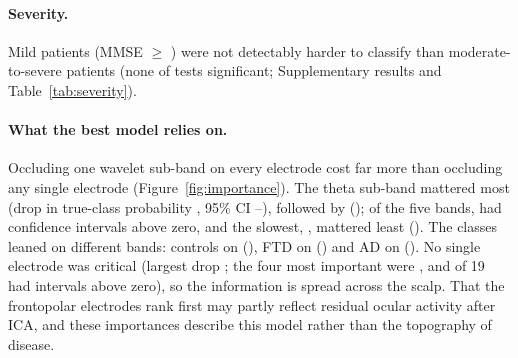 \paragraph{Severity.} Mild patients (MMSE $\ge$ \sevMildMin{}) were not detectably harder to classify than moderate-to-severe patients (none of \sevNTests{} tests significant; Supplementary results and Table~\ref{tab:severity}).

\paragraph{What the best model relies on.} Occluding one wavelet sub-band on every electrode cost
far more than occluding any single electrode (Figure~\ref{fig:importance}). The theta sub-band
\occTopBand{} mattered most (drop in true-class probability \occTopBandDrop{}, 95\% CI
\occTopBandLo{}--\occTopBandHi{}), followed by \occSecondBand{} (\occSecondBandDrop{}); of the five bands,
\occNBandPositive{} had confidence intervals above zero, and the slowest, \occBottomBand{}, mattered least
(\occBottomBandDrop{}). The classes leaned on different bands: controls on \occBandCN{} (\occBandCNDrop{}),
FTD on \occBandFTD{} (\occBandFTDDrop{}) and AD on \occBandAD{} (\occBandADDrop{}). No single electrode
was critical (largest drop \occTopDrop{}; the four most important were \occTopElectrodes{}, and
\occNElecPositive{} of 19 had intervals above zero), so the information is spread across the scalp. That the frontopolar electrodes rank first
may partly reflect residual ocular activity after ICA, and these importances describe this model rather
than the topography of disease.

